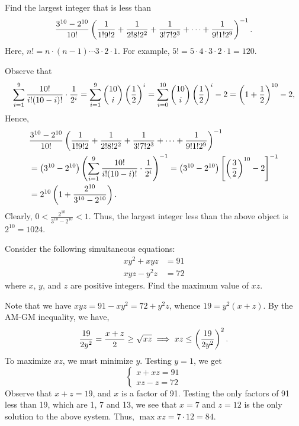 \begin{question}[1024]\label{Q::2023-S-1-11}
    Find the largest integer that is less than \[\frac{3^{10} - 2^{10}}{10!} \left( \frac1{1! 9! 2} + \frac1{2! 8! 2^2} + \frac1{3! 7! 2^3} + \cdots + \frac1{9! 1! 2^9} \right)^{-1}.\] Here, $n! = n \cdot (n-1) \cdots 3 \cdot 2 \cdot 1$. For example, $5! = 5 \cdot 4 \cdot 3 \cdot 2 \cdot 1 = 120$.
\end{question}
\begin{solution*}
    Observe that \[\sum_{i = 1}^9 \frac{10!}{i! (10-i)!} \cdot \frac{1}{2^i} = \sum_{i = 1}^9 \binom{10}{i} \left( \frac12 \right)^i = \sum_{i = 0}^{10} \binom{10}{i} \left( \frac12 \right)^i - 2 = \left( 1 + \frac12 \right)^{10} - 2,\] Hence,
    \begin{align*}
        &\frac{3^{10} - 2^{10}}{10!} \left( \frac1{1! 9! 2} + \frac1{2! 8! 2^2} + \frac1{3! 7! 2^3} + \cdots + \frac1{9! 1! 2^9} \right)^{-1}\\
        &= \left( 3^{10} - 2^{10} \right) \left( \sum_{i = 1}^9 \frac{10!}{i! (10-i)!} \cdot \frac{1}{2^i} \right)^{-1} = \left( 3^{10} - 2^{10} \right) \left[ \left( \frac32 \right)^{10} - 2 \right]^{-1}\\
        &= 2^{10} \left( 1  + \frac{2^{10}}{3^{10} - 2^{10}} \right).
    \end{align*}
    Clearly, $0 < \frac{2^{10}}{3^{10} - 2^{10}} < 1$. Thus, the largest integer less than the above object is $2^{10} = 1024$.
\end{solution*}

\begin{question}[84]\label{Q::2023-S-1-12}
    Consider the following simultaneous equations:
    \begin{align*}
        xy^2 + xyz &= 91\\
        xyz - y^2z &= 72
    \end{align*}
    where $x$, $y$, and $z$ are positive integers. Find the maximum value of $xz$.
\end{question}
\begin{solution*}
    Note that we have $xyz = 91 - xy^2 = 72 + y^2 z$, whence $19 = y^2 (x + z)$. By the AM-GM inequality, we have, \[\frac{19}{2y^2} = \frac{x + z}{2} \geq \sqrt{xz} \implies xz \leq \left( \frac{19}{2y^2} \right)^2.\] To maximize $xz$, we must minimize $y$. Testing $y = 1$, we get \[\left\{\begin{aligned}
        x + xz = 91\\
        xz - z = 72
    \end{aligned}\right.\] Observe that $x + z = 19$, and $x$ is a factor of 91. Testing the only factors of 91 less than 19, which are 1, 7 and 13, we see that $x = 7$ and $z = 12$ is the only solution to the above system. Thus, $\max xz = 7 \cdot 12 = 84$.
\end{solution*}

